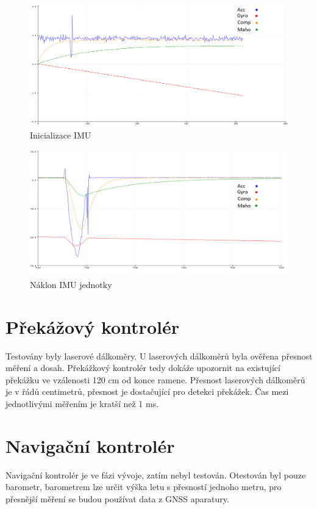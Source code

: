 \begin{figure}[H]
	\centering
	\includegraphics[width=14cm]{pictures/testRoll}
	\caption{Inicializace IMU}
\end{figure}

\begin{figure}[H]
	\centering
	\includegraphics[width=14cm]{pictures/testRoll1}
	\caption{Náklon IMU jednotky}
\end{figure}

\section{Překážový kontrolér}
Testovány byly laserové dálkoměry. U laserových dálkoměrů byla ověřena přesnost měření a dosah. Překážkový kontrolér tedy dokáže upozornit na existující překážku ve vzálenosti 120 cm od konce ramene. Přesnost laserových dálkoměrů je v řádů centimetrů, přesnost je dostačující pro detekci překážek. Čas mezi jednotlivými měřením je kratší než 1 ms.\\

\section{Navigační kontrolér}
Navigační kontrolér je ve fázi vývoje, zatím nebyl testován. Otestován byl pouze barometr, barometrem lze určit výška letu s přesností jednoho metru, pro přesnější měření se budou používat data z GNSS aparatury.\\

